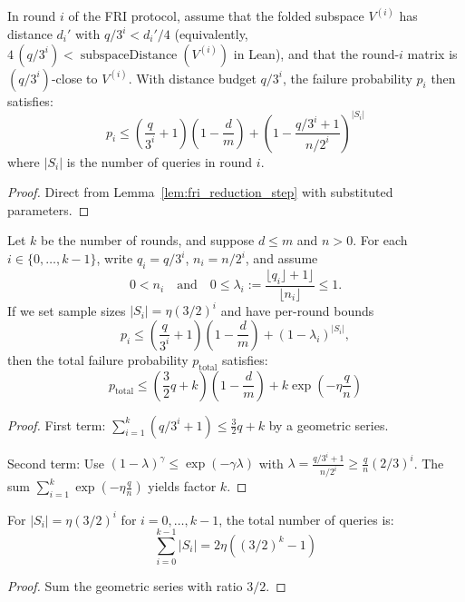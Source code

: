 \begin{lemma}\label{lem:round_wise_error}\leanok {}
In round $i$ of the FRI protocol, assume that the folded subspace $V^{(i)}$ has distance $d_i'$ with $q/3^i < d_i'/4$ (equivalently, $4\,(q/3^i) < \operatorname{subspaceDistance}(V^{(i)})$ in Lean), and that the round-$i$ matrix is $(q/3^i)$-close to $V^{(i)}$.
With distance budget $q/3^i$, the failure probability $p_i$ then satisfies:
\[ p_i \leq \left(\frac{q}{3^i} + 1\right)\left(1 - \frac{d}{m}\right) + \left(1 - \frac{q/3^i + 1}{n/2^i}\right)^{|S_i|} \]
where $|S_i|$ is the number of queries in round $i$.
\end{lemma}
\begin{proof} \leanok
Direct from Lemma~\ref{lem:fri_reduction_step} with substituted parameters.
\end{proof}

\begin{lemma}\label{lem:geometric_summation}  \leanok
{}
Let $k$ be the number of rounds, and suppose $d \le m$ and $n > 0$.
For each $i \in \{0,\dots,k-1\}$, write $q_i = q/3^i$, $n_i = n/2^i$, and assume
\[
0 < n_i \quad\text{and}\quad 0 \le \lambda_i := \frac{\lfloor q_i \rfloor + 1\rfloor}{\lfloor n_i \rfloor} \le 1.
\]
If we set sample sizes $|S_i| = \eta(3/2)^i$ and have per-round bounds
\[
p_i \le \left(\frac{q}{3^i} + 1\right)\left(1 - \frac{d}{m}\right)
  + \left(1 - \lambda_i\right)^{|S_i|},
\]
then the total failure probability $p_{\text{total}}$ satisfies:
\[ p_{\text{total}} \leq \left(\frac{3}{2}q + k\right)\left(1 - \frac{d}{m}\right) + k \exp\left(-\eta \frac{q}{n}\right) \]
\end{lemma}
\begin{proof} \leanok
First term: $\sum_{i=1}^k (q/3^i + 1) \leq \frac{3}{2}q + k$ by a geometric series.

Second term: Use $(1-\lambda)^\gamma \leq \exp(-\gamma\lambda)$ with $\lambda = \frac{q/3^i + 1}{n/2^i} \geq \frac{q}{n}(2/3)^i$. The sum $\sum_{i=1}^k \exp(-\eta \frac{q}{n})$ yields factor $k$.
\end{proof}

\begin{lemma}\label{lem:query_count}\leanok {}
For $|S_i| = \eta(3/2)^i$ for $i = 0,\dots,k-1$, the total number of queries is:
\[ \sum_{i=0}^{k-1} |S_i| = 2\eta\left((3/2)^{k} - 1\right) \]
\end{lemma}
\begin{proof} \leanok
Sum the geometric series with ratio $3/2$.
\end{proof}

